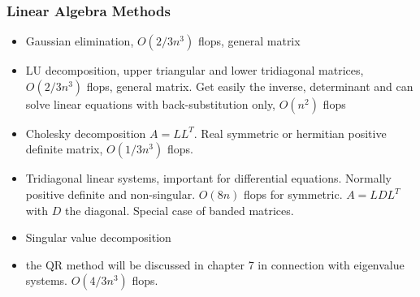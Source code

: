 \documentclass[compress]{beamer}
\begin{document}


\frame
{
  \frametitle{Linear Algebra Methods}
\begin{itemize}
\item Gaussian elimination, $O(2/3n^3)$ flops, general matrix
\item LU decomposition, upper triangular and lower tridiagonal
     matrices, $O(2/3n^3)$ flops, general matrix. Get easily the inverse,
     determinant and can solve linear equations with back-substitution only,
     $O(n^2)$ flops
\item Cholesky decomposition $A=LL^T$. Real symmetric or hermitian positive definite
matrix, $O(1/3n^3)$ flops.
\item Tridiagonal linear systems, important for differential equations. Normally
positive definite and non-singular. $O(8n)$ flops for symmetric. $A=LDL^T$ with $D$ the diagonal.
Special case of banded matrices.
\item Singular value decomposition
\item the QR method will be discussed in chapter 7 in connection with eigenvalue systems. $O(4/3n^3)$ flops.
\end{itemize}
}
\end{document}
